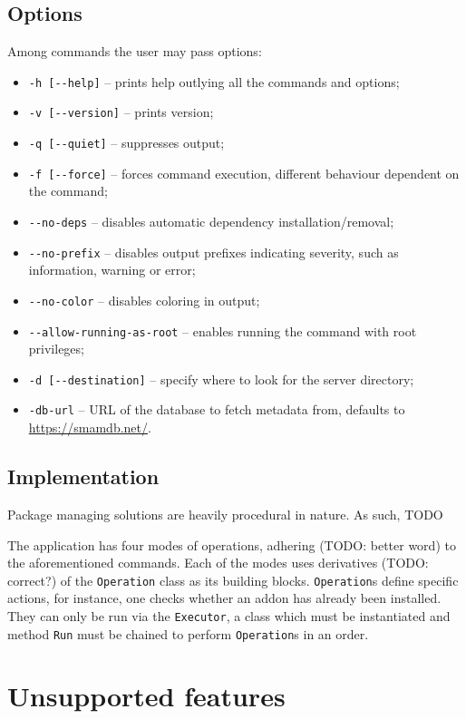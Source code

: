 \subsection{Options}

Among commands the user may pass options:
\begin{itemize}
    \item \verb|-h [--help]| -- prints help outlying all the commands and options;
    \item \verb|-v [--version]| -- prints version;
    \item \verb|-q [--quiet]| -- suppresses output;
    \item \verb|-f [--force]| -- forces command execution, different behaviour dependent on the command;
    \item \verb|--no-deps| -- disables automatic dependency installation/removal;
    \item \verb|--no-prefix| -- disables output prefixes indicating severity, such as information, warning or error;
    \item \verb|--no-color| -- disables coloring in output;
    \item \verb|--allow-running-as-root| -- enables running the command with root privileges;
    \item \verb|-d [--destination]| -- specify where to look for the server directory;
    \item \verb|-db-url| -- URL of the database to fetch metadata from, defaults to \url{https://smamdb.net/}.
\end{itemize}

\subsection{Implementation}

Package managing solutions are heavily procedural in nature.
As such, TODO

The application has four modes of operations, adhering (TODO: better word) to the aforementioned commands.
Each of the modes uses derivatives (TODO: correct?) of the \verb|Operation| class as its building blocks.
\verb|Operation|s define specific actions, for instance, one checks whether an addon has already been installed.
They can only be run via the \verb|Executor|, a class which must be instantiated and method \verb|Run| must be chained to perform \verb|Operation|s in an order.

\section{Unsupported features}

